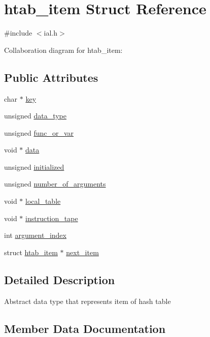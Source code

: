 \hypertarget{structhtab__item}{}\section{htab\+\_\+item Struct Reference}
\label{structhtab__item}


{\ttfamily \#include $<$ial.\+h$>$}



Collaboration diagram for htab\+\_\+item\+:
\subsection*{Public Attributes}
\begin{DoxyCompactItemize}
\item 
char $\ast$ \hyperlink{structhtab__item_a66b265819081d3527ad1941f8bcb09d6}{key}
\item 
unsigned \hyperlink{structhtab__item_a884c03e9b59149a95829a71901276a8b}{data\+\_\+type}
\item 
unsigned \hyperlink{structhtab__item_a646c1a75cab8e90247c082d080782803}{func\+\_\+or\+\_\+var}
\item 
void $\ast$ \hyperlink{structhtab__item_aa1b7ec267e7ba427e04f1c2f36fd12b6}{data}
\item 
unsigned \hyperlink{structhtab__item_a7a297ff53beac4e5bd00982369fee710}{initialized}
\item 
unsigned \hyperlink{structhtab__item_a3f6b7b1fb06bd1a500375bd68a26685d}{number\+\_\+of\+\_\+arguments}
\item 
void $\ast$ \hyperlink{structhtab__item_ab925f22b6d466d9d5c6e3099b79dfb58}{local\+\_\+table}
\item 
void $\ast$ \hyperlink{structhtab__item_a88ce186940697b2875ed88bdaca2db12}{instruction\+\_\+tape}
\item 
int \hyperlink{structhtab__item_a890983537face39050d82ef9087c12ff}{argument\+\_\+index}
\item 
struct \hyperlink{structhtab__item}{htab\+\_\+item} $\ast$ \hyperlink{structhtab__item_a8fe0d8f000c284334b0d939982239030}{next\+\_\+item}
\end{DoxyCompactItemize}


\subsection{Detailed Description}
Abstract data type that represents item of hash table 

\subsection{Member Data Documentation}
